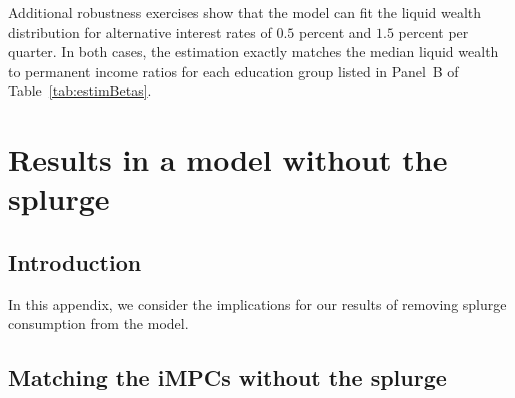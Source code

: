 \documentclass[\latexroot/\projectname]{subfiles}
\begin{document}

\whenstandalone{%
  \setcounter{section}{1}  %
}

Additional robustness exercises show that the model can fit the liquid wealth distribution for alternative interest rates of $0.5$ percent and $1.5$ percent per quarter. In both cases, the estimation exactly matches the median liquid wealth to permanent income ratios for each education group listed in Panel~B of Table~\ref{tab:estimBetas}.
\section{Results in a model without the splurge}
\whenintegrated{\label{app:Model-without-splurge}} %

\subsection{Introduction}
\whenintegrated{\label{app:Model-without-splurge-intro}} %

In this appendix, we consider the implications for our results of removing splurge consumption from the model. 

\subsection{Matching the iMPCs without the splurge}
\whenintegrated{\label{app:nosplurge-matching-impcs}} %
\end{document}
